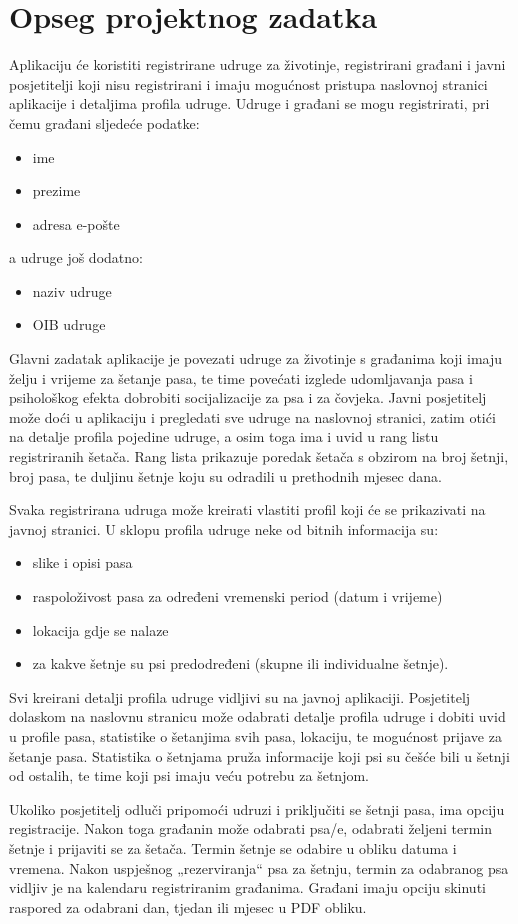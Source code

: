	\section{Opseg projektnog zadatka}
	Aplikaciju će koristiti registrirane udruge za životinje, registrirani
	građani i javni posjetitelji koji nisu registrirani i imaju mogućnost
	pristupa naslovnoj stranici aplikacije i detaljima profila udruge.
	Udruge i građani se mogu registrirati, pri čemu građani sljedeće podatke:
	\begin{itemize}
		\item ime
		\item prezime
		\item adresa e-pošte
	\end{itemize} 
	a udruge još dodatno:
	\begin{itemize}
		\item naziv udruge
		\item OIB udruge
	\end{itemize}
	Glavni zadatak aplikacije je povezati udruge za životinje s građanima koji imaju
	želju i vrijeme za šetanje pasa, te time povećati izglede udomljavanja pasa i psihološkog
	efekta dobrobiti socijalizacije za psa i za čovjeka. Javni posjetitelj može doći u aplikaciju i
	pregledati sve udruge na naslovnoj stranici, zatim otići na detalje profila pojedine udruge,
	a osim toga ima i uvid u rang listu registriranih šetača.
	 Rang lista prikazuje poredak šetača
	s obzirom na broj šetnji, broj pasa, te duljinu šetnje koju su odradili u prethodnih mjesec
	dana.  \vspace{10pt} \par 
	Svaka registrirana udruga može kreirati vlastiti profil koji će se prikazivati na javnoj
	stranici. U sklopu profila udruge neke od bitnih informacija su: 
	\begin{itemize}
		\item slike i opisi pasa
		\item raspoloživost pasa za određeni vremenski period (datum i vrijeme) 
		\item lokacija gdje se nalaze
		\item za kakve šetnje su psi predodređeni (skupne ili individualne šetnje). 
	\end{itemize}
	Svi
	kreirani detalji profila udruge vidljivi su na javnoj aplikaciji. Posjetitelj dolaskom na
	naslovnu stranicu može odabrati detalje profila udruge i dobiti uvid u profile pasa,
	statistike o šetanjima svih pasa, lokaciju, te mogućnost prijave za šetanje pasa. Statistika
	o šetnjama pruža informacije koji psi su češće bili u šetnji od ostalih, te time koji psi imaju
	veću potrebu za šetnjom. \vspace{10pt} \par 
	 Ukoliko posjetitelj odluči pripomoći udruzi i priključiti se šetnji
	pasa, ima opciju registracije. Nakon toga građanin može odabrati psa/e, odabrati željeni
	termin šetnje i prijaviti se za šetača. Termin šetnje se odabire u obliku datuma i vremena.
	Nakon uspješnog „rezerviranja“ psa za šetnju, termin za odabranog psa vidljiv je na
	kalendaru registriranim građanima. Građani imaju opciju skinuti 
	raspored za odabrani dan, tjedan ili mjesec u PDF obliku.\par
	
